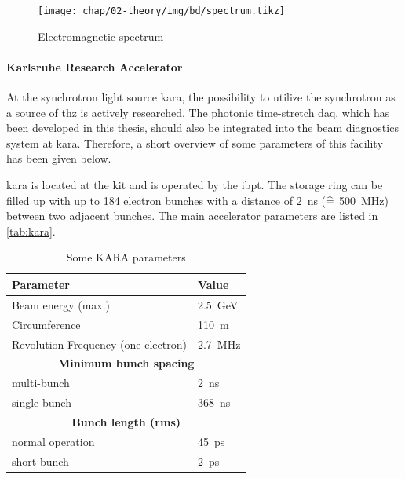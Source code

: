 \begin{figure}[H]
	\centering
	\texttt{[image: chap/02-theory/img/bd/spectrum.tikz]}
	\caption{Electromagnetic spectrum} %
	\label{fig:spectrum}
\end{figure}


\paragraph{Karlsruhe Research Accelerator}
At the synchrotron light source \gls{kara}, the possibility to utilize the synchrotron as a source of \gls{thz} is actively researched. 
The photonic time-stretch \gls{daq}, which has been developed in this thesis, should also be integrated into the beam diagnostics system at \gls{kara}. 
Therefore, a short overview of some parameters of this facility has been given below.

\gls{kara} is located at the \gls{kit} and is operated by the \gls{ibpt}.
The storage ring can be filled up with up to 184 electron bunches with a distance of \SI{2}{\nano\second} ($\mathrel{\widehat{=}}$ \SI{500}{\mega\hertz}) between two adjacent bunches.
The main accelerator parameters are listed in \autoref{tab:kara}. 

\begin{table}[tb]
	\caption{Some KARA parameters \cite{rota2018}}
	\label{tab:kara}
	\centering
	\begin{tabular}{ll}
		\toprule
		\textbf{Parameter}                  & \textbf{Value}                \\ \midrule
		Beam energy (max.)                  & \SI{2.5}{\giga \electronvolt} \\
		Circumference                       & \SI{110}{\meter}              \\
		Revolution Frequency (one electron) & \SI{2.7}{\mega \hertz}        \\
		\multicolumn{2}{c}{\textbf{Minimum bunch spacing}}          \\
		\quad multi-bunch                   & \SI{2}{\nano \second}         \\
		\quad single-bunch                  & \SI{368}{\nano \second}       \\
		\multicolumn{2}{c}{\textbf{Bunch length (rms)}}           \\
		\quad normal operation              & \SI{45}{\pico \second}        \\
		\quad short bunch                   & \SI{2}{\pico \second}         \\ \bottomrule
	\end{tabular}
\end{table}

